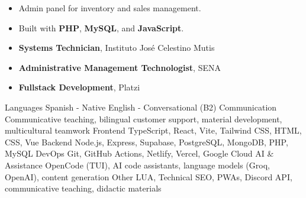 \documentclass[11pt, a4paper]{awesome-cv}
\begin{document}
\divider

\begin{itemize}
  \item Admin panel for inventory and sales management.
  \item Built with \textbf{PHP}, \textbf{MySQL}, and \textbf{JavaScript}.
\end{itemize}


\begin{itemize}
  \item \textbf{Systems Technician}, Instituto José Celestino Mutis
  \item \textbf{Administrative Management Technologist}, SENA
  \item \textbf{Fullstack Development}, Platzi
\end{itemize}


\begin{cvskills}
  \cvskill
    {Languages}
    {Spanish - Native \quad English - Conversational (B2)}
  \cvskill
    {Communication}
    {Communicative teaching, bilingual customer support, material development, multicultural teamwork}
  \cvskill
    {Frontend}
    {TypeScript, React, Vite, Tailwind CSS, HTML, CSS, Vue}
  \cvskill
    {Backend}
    {Node.js, Express, Supabase, PostgreSQL, MongoDB, PHP, MySQL}
  \cvskill
    {DevOps}
    {Git, GitHub Actions, Netlify, Vercel, Google Cloud}
  \cvskill
    {AI \& Assistance}
    {OpenCode (TUI), AI code assistants, language models (Groq, OpenAI), content generation}
  \cvskill
    {Other}
    {LUA, Technical SEO, PWAs, Discord API, communicative teaching, didactic materials}
\end{cvskills}

\end{document}
